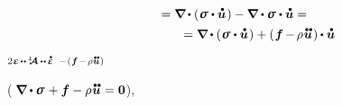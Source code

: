 \begin{equation*}
\begin{array}{c}
= \boldnabla \hspace{-0.1ex} \dotp \left( \hspace{.1ex} \linearstress \dotp \mathdotabove{\bm{u}} \hspace{.15ex} \right) -
\tikzmark{NablaDotTauDynamicsBegin} \boldnabla \dotp \linearstress \tikzmark{NablaDotTauDynamicsEnd} \dotp \mathdotabove{\bm{u}} =
\\[.4em]
%
\hspace*{4em}
= \boldnabla \hspace{-0.1ex} \dotp \left( \hspace{.1ex} \linearstress \dotp \mathdotabove{\bm{u}} \hspace{.15ex} \right)
+ ( \hspace{.12ex} \bm{f} \hspace{-0.2ex} - \hspace{-0.2ex} \rho \hspace{.1ex} \mathdotdotabove{\bm{u}} \hspace{.15ex} ) \hspace{-0.1ex} \dotp \mathdotabove{\bm{u}}
\end{array}
\end{equation*}%
%
{${\scalebox{0.75}{$ 2 \hspace{.2ex} \infinitesimaldeformation \hspace{-0.1ex} \dotdotp \hspace{-0.1ex} \stiffnesstensor \dotdotp \hspace{-0.1ex} \mathdotabove{\infinitesimaldeformation} $}}$}
%
{${\scalebox{0.75}{$ - \hspace{.2ex} ( \hspace{.12ex} \bm{f} \hspace{-0.2ex} - \hspace{-0.2ex} \rho \hspace{.1ex} \mathdotdotabove{\bm{u}} \hspace{.15ex} ) $}}$}

\nopagebreak\vspace{-0.6em}\noindent
( ${\hspace{-0.24ex}\boldnabla \dotp \linearstress \hspace{.15ex} + \bm{f} - \rho \hspace{.1ex} \mathdotdotabove{\bm{u}} \hspace{.1ex} = \bm{0}}$),

